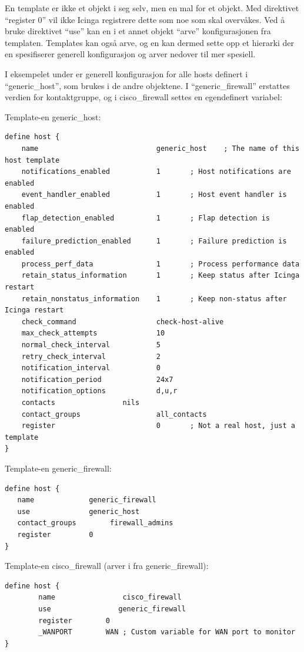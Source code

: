 En template er ikke et objekt i seg selv, men en mal for et objekt. Med direktivet “register 0” vil ikke Icinga registrere dette som noe som skal overvåkes. Ved å bruke direktivet “use” kan en i et annet objekt “arve” konfigurasjonen fra templaten. Templates kan også arve, og en kan dermed sette opp et hierarki der en spesifiserer generell konfigurasjon og arver nedover til mer spesiell. 

I eksempelet under er generell konfigurasjon for alle hosts definert i “generic\_host”, som brukes i de andre objektene. I “generic\_firewall” erstattes verdien for kontaktgruppe, og i cisco\_firewall settes en egendefinert variabel:

Template-en generic\_host: 

\begin{lstlisting}
define host {
	name                            generic_host    ; The name of this host template
	notifications_enabled           1       ; Host notifications are enabled
	event_handler_enabled           1       ; Host event handler is enabled
	flap_detection_enabled          1       ; Flap detection is enabled
	failure_prediction_enabled      1       ; Failure prediction is enabled
	process_perf_data               1       ; Process performance data
	retain_status_information       1       ; Keep status after Icinga restart
	retain_nonstatus_information    1       ; Keep non-status after Icinga restart
	check_command                   check-host-alive
	max_check_attempts              10
	normal_check_interval           5
	retry_check_interval            2
	notification_interval           0
	notification_period             24x7
	notification_options            d,u,r
	contacts                nils
	contact_groups                  all_contacts
	register                        0       ; Not a real host, just a template
}
\end{lstlisting}

Template-en generic\_firewall:

\begin{lstlisting}
define host {
   name             generic_firewall
   use              generic_host
   contact_groups        firewall_admins
   register         0
}
\end{lstlisting}

Template-en cisco\_firewall (arver i fra generic\_firewall):

\begin{lstlisting}
define host {
        name                cisco_firewall
        use                generic_firewall
        register        0
        _WANPORT        WAN ; Custom variable for WAN port to monitor
}
\end{lstlisting}

